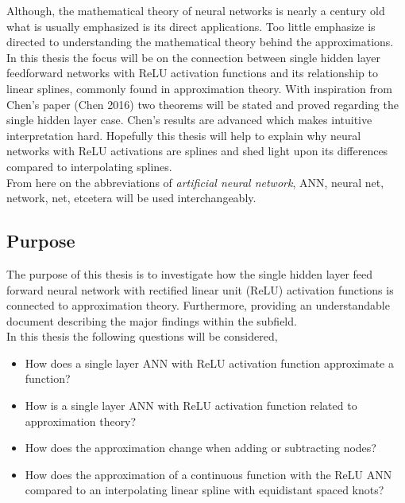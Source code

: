 \documentclass[11pt, letterpaper]{amsart}
\begin{document}
Although, the mathematical theory of neural networks is nearly a century old what is usually emphasized is its direct applications. Too little emphasize is directed to understanding the mathematical theory behind the approximations. In this thesis the focus will be on the connection between single hidden layer feedforward networks with ReLU activation functions and its relationship to linear splines, commonly found in approximation theory. With inspiration from Chen's paper (Chen 2016) two theorems will be stated and proved regarding the single hidden layer case. Chen's results are advanced which makes intuitive interpretation hard. Hopefully this thesis will help to explain why neural networks with ReLU activations are splines and shed light upon its differences compared to interpolating splines.
\\

From here on the abbreviations of \textit{artificial neural network}, ANN, neural net, network, net, etcetera will be used interchangeably.

\subsection{Purpose}
The purpose of this thesis is to investigate how the single hidden layer feed forward neural network with rectified linear unit (ReLU) activation functions is connected to approximation theory. Furthermore, providing an understandable document describing the major findings within the subfield.
\\

In this thesis the following questions will be considered,

\begin{itemize}
\item How does a single layer ANN with ReLU activation function approximate a function?
\\

\item How is a single layer ANN with ReLU activation function related to approximation theory?
\\

\item How does the approximation change when adding or subtracting nodes?
\\

\item How does the approximation of a continuous function with the ReLU ANN compared to an interpolating linear spline with equidistant spaced knots?
\end{itemize}
\end{document}
